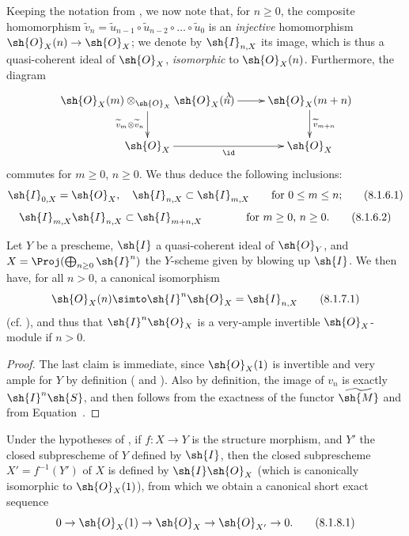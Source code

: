 \begin{env}[8.1.6]
\label{II.8.1.6}
Keeping the notation from , we now note that, for $n\geq0$, the composite homomorphism $\widetilde{v}_n = \widetilde{u}_{n-1} \circ \widetilde{u}_{n-2} \circ \ldots \circ \widetilde{u}_0$ is an \emph{injective} homomorphism $\sh{O}_X(n) \to \sh{O}_X$;
we denote by $\sh{I}_{n,X}$ its image, which is thus a quasi-coherent ideal of $\sh{O}_X$, \emph{isomorphic} to $\sh{O}_X(n)$.
Furthermore, the diagram
\[
  \xymatrix{
    \sh{O}_X(m) \otimes_{\sh{O}_X} \sh{O}_X(n)
      \ar[r]^{\lambda}
      \ar[d]_{\widetilde{v}_m \otimes \widetilde{v}_n}
  & \sh{O}_X(m+n)
      \ar[d]^{\widetilde{v}_{m+n}}
  \\\sh{O}_X
      \ar[r]_{\id}
  & \sh{O}_X
  }
\]
commutes for $m\geq0$, $n\geq0$.
We thus deduce the following inclusions:
\[
\label{II.8.1.6.1}
  \sh{I}_{0,X} = \sh{O}_X, \quad \sh{I}_{n,X} \subset \sh{I}_{m,X}
  \qquad\mbox{for $0\leq m\leq n$;}
\tag{8.1.6.1}
\]
\[
\label{II.8.1.6.2}
  \sh{I}_{m,X}\sh{I}_{n,X} \subset \sh{I}_{m+n,X}
  \qquad\qquad\mbox{for $m\geq0$, $n\geq0$.}
\tag{8.1.6.2}
\]
\end{env}


\begin{proposition}[8.1.7]
\label{II.8.1.7}
Let $Y$ be a prescheme, $\sh{I}$ a quasi-coherent ideal of $\sh{O}_Y$, and $X = \Proj(\bigoplus_{n\geq0}\sh{I}^n)$ the $Y$-scheme given by blowing up $\sh{I}$.
We then have, for all $n>0$, a canonical isomorphism
\[
\label{II.8.1.7.1}
  \sh{O}_X(n) \simto \sh{I}^n\sh{O}_X = \sh{I}_{n,X}
\tag{8.1.7.1}
\]
(cf. ), and thus that $\sh{I}^n\sh{O}_X$ is a very-ample invertible $\sh{O}_X$-module if $n>0$.
\end{proposition}

\begin{proof}
The last claim is immediate, since $\sh{O}_X(1)$ is invertible  and very ample for $Y$ by definition ( and ).
Also by definition, the image of $v_n$ is exactly $\sh{I}^n\sh{S}$, and  then follows from the exactness of the functor $\widetilde{\sh{M}}$  and from Equation~.
\end{proof}

\begin{corollary}[8.1.8]
\label{II.8.1.8}
Under the hypotheses of , if $f:X\to Y$ is the structure morphism, and $Y'$ the closed subprescheme of $Y$ defined by $\sh{I}$, then the closed subprescheme $X' = f^{-1}(Y')$ of $X$ is defined by $\sh{I}\sh{O}_X$ (which is canonically isomorphic to $\sh{O}_X(1)$), from which we obtain a canonical short exact sequence
\[
\label{II.8.1.8.1}
  0 \to \sh{O}_X(1) \to \sh{O}_X \to \sh{O}_{X'} \to 0.
\tag{8.1.8.1}
\]
\end{corollary}

